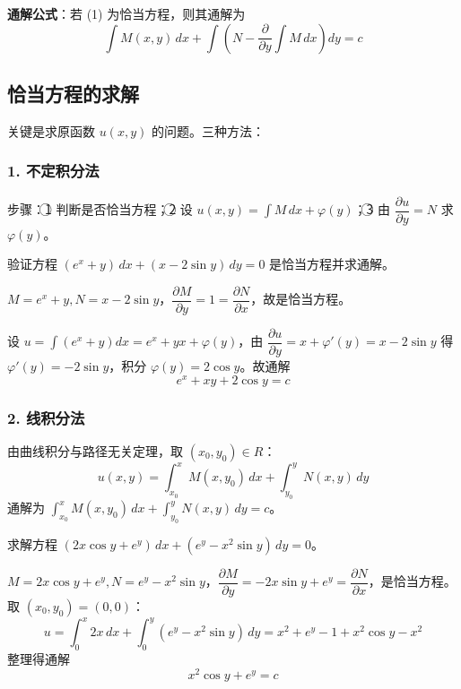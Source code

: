 \textbf{通解公式}：若 (1) 为恰当方程，则其通解为
$$\int M(x,y)\,dx + \int\left(N - \frac{\partial}{\partial y}\int M\,dx\right)dy = c$$

\subsection{恰当方程的求解}

关键是求原函数 $u(x,y)$ 的问题。三种方法：

\subsubsection{1. 不定积分法}

步骤：\textcircled{1} 判断是否恰当方程；\textcircled{2} 设 $u(x,y) = \int M\,dx + \varphi(y)$；\textcircled{3} 由 $\dfrac{\partial u}{\partial y} = N$ 求 $\varphi(y)$。

\begin{example}
验证方程 $(e^x + y)\,dx + (x - 2\sin y)\,dy = 0$ 是恰当方程并求通解。
\end{example}

\begin{solution}
$M = e^x + y, N = x - 2\sin y$，$\dfrac{\partial M}{\partial y} = 1 = \dfrac{\partial N}{\partial x}$，故是恰当方程。

设 $u = \int(e^x + y)dx = e^x + yx + \varphi(y)$，由 $\dfrac{\partial u}{\partial y} = x + \varphi'(y) = x - 2\sin y$ 得 $\varphi'(y) = -2\sin y$，积分 $\varphi(y) = 2\cos y$。故通解
$$e^x + xy + 2\cos y = c$$
\end{solution}

\subsubsection{2. 线积分法}

由曲线积分与路径无关定理，取 $(x_0, y_0) \in R$：
$$u(x,y) = \int_{x_0}^{x} M(x, y_0)\,dx + \int_{y_0}^{y} N(x, y)\,dy$$
通解为 $\int_{x_0}^{x} M(x,y_0)\,dx + \int_{y_0}^{y} N(x,y)\,dy = c$。

\begin{example}
求解方程 $(2x\cos y + e^y)\,dx + (e^y - x^2\sin y)\,dy = 0$。
\end{example}

\begin{solution}
$M = 2x\cos y + e^y, N = e^y - x^2\sin y$，$\dfrac{\partial M}{\partial y} = -2x\sin y + e^y = \dfrac{\partial N}{\partial x}$，是恰当方程。取 $(x_0,y_0) = (0,0)$：
$$u = \int_0^x 2x\,dx + \int_0^y (e^y - x^2\sin y)\,dy = x^2 + e^y - 1 + x^2\cos y - x^2$$
整理得通解
$$x^2\cos y + e^y = c$$
\end{solution}

